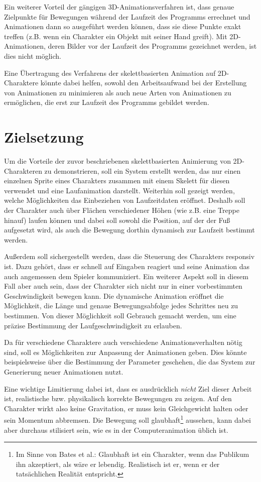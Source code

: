 Ein weiterer Vorteil der gängigen 3D-Animationsverfahren ist, dass genaue Zielpunkte für Bewegungen während der Laufzeit des Programms errechnet und Animationen dann so ausgeführt werden können, dass sie diese Punkte exakt treffen (z.B. wenn ein Charakter ein Objekt mit seiner Hand greift). Mit 2D-Animationen, deren Bilder vor der Laufzeit des Programms gezeichnet werden, ist dies nicht möglich.

Eine Übertragung des Verfahrens der skelettbasierten Animation auf 2D-Charaktere könnte dabei helfen, sowohl den Arbeitsaufwand bei der Erstellung von Animationen zu minimieren als auch neue Arten von Animationen zu ermöglichen, die erst zur Laufzeit des Programms gebildet werden.

\section{Zielsetzung}
Um die Vorteile der zuvor beschriebenen skelettbasierten Animierung von 2D-Charakteren zu demonstrieren, soll ein System erstellt werden, das nur einen einzelnen Sprite eines Charakters zusammen mit einem Skelett für diesen verwendet und eine Laufanimation darstellt. Weiterhin soll gezeigt werden, welche Möglichkeiten das Einbeziehen von Laufzeitdaten eröffnet. Deshalb soll der Charakter auch über Flächen verschiedener Höhen (wie z.B. eine Treppe hinauf) laufen können und dabei soll sowohl die Position, auf der der Fuß aufgesetzt wird, als auch die Bewegung dorthin dynamisch zur Laufzeit bestimmt werden.

Außerdem soll sichergestellt werden, dass die Steuerung des Charakters responsiv ist. Dazu gehört, dass er schnell auf Eingaben reagiert und seine Animation das auch angemessen dem Spieler kommuniziert. Ein weiterer Aspekt soll in diesem Fall aber auch sein, dass der Charakter sich nicht nur in einer vorbestimmten Geschwindigkeit bewegen kann. Die dynamische Animation eröffnet die Möglichkeit, die Länge und genaue Bewegungsabfolge jedes Schrittes neu zu bestimmen. Von dieser Möglichkeit soll Gebrauch gemacht werden, um eine präzise Bestimmung der Laufgeschwindigkeit zu erlauben.

Da für verschiedene Charaktere auch verschiedene Animationsverhalten nötig sind, soll es Möglichkeiten zur Anpassung der Animationen geben. Dies könnte beispielsweise über die Bestimmung der Parameter geschehen, die das System zur Generierung neuer Animationen nutzt.

Eine wichtige Limitierung dabei ist, dass es ausdrücklich \textit{nicht} Ziel dieser Arbeit ist, realistische bzw. physikalisch korrekte Bewegungen zu zeigen. Auf den Charakter wirkt also keine Gravitation, er muss kein Gleichgewicht halten oder sein Momentum abbremsen. Die Bewegung soll glaubhaft\footnote{Im Sinne von Bates et al.\cite{bates1994role}: Glaubhaft ist ein Charakter, wenn das Publikum ihn akzeptiert, als wäre er lebendig. Realistisch ist er, wenn er der tatsächlichen Realität entspricht.} aussehen, kann dabei aber durchaus stilisiert sein, wie es in der Computeranimation üblich ist.

